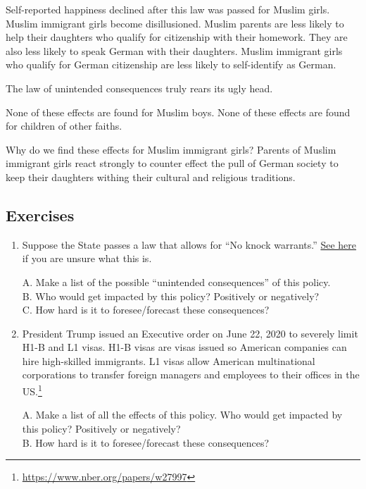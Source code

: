 \documentclass[
]{book}
\begin{document}
Self-reported happiness declined after this law was passed for Muslim girls. Muslim immigrant girls become disillusioned. Muslim parents are less likely to help their daughters who qualify for citizenship with their homework. They are also less likely to speak German with their daughters. Muslim immigrant girls who qualify for German citizenship are less likely to self-identify as German.

The law of unintended consequences truly rears its ugly head.

None of these effects are found for Muslim boys. None of these effects are found for children of other faiths.

Why do we find these effects for Muslim immigrant girls? Parents of Muslim immigrant girls react strongly to counter effect the pull of German society to keep their daughters withing their cultural and religious traditions.

\hypertarget{exercises}{%
\subsection{Exercises}\label{exercises}}

\begin{enumerate}
\def\labelenumi{\arabic{enumi}.}
\item
  Suppose the State passes a law that allows for ``No knock warrants.'' \href{https://en.wikipedia.org/wiki/No-knock_warrant\#:~:text=In\%20the\%20United\%20States\%2C\%20a,knocking\%20or\%20ringing\%20a\%20doorbell}{See here} if you are unsure what this is.

  A. Make a list of the possible ``unintended consequences'' of this policy.\\
  B. Who would get impacted by this policy? Positively or negatively?\\
  C. How hard is it to foresee/forecast these consequences?
\item
  President Trump issued an Executive order on June 22, 2020 to severely limit H1-B and L1 visas. H1-B visas are visas issued so American companies can hire high-skilled immigrants. L1 visas allow American multinational corporations to transfer foreign managers and employees to their offices in the US.\footnote{\url{https://www.nber.org/papers/w27997}}

  A. Make a list of all the effects of this policy. Who would get impacted by this policy? Positively or negatively?\\
  B. How hard is it to foresee/forecast these consequences?
\end{enumerate}
\end{document}
